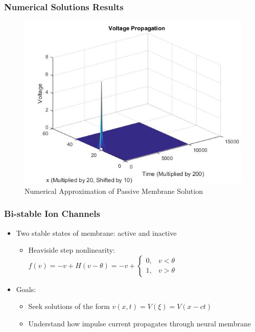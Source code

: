 \documentclass{beamer}
\begin{document}
\begin{frame}
\frametitle{Numerical Solutions Results}
\begin{figure}[H]
  \includegraphics[width=\linewidth]{Plot2.jpg}
  \caption{Numerical Approximation of Passive Membrane Solution}
  \label{fig:sketch2}
\end{figure}
\end{frame}


\begin{frame}
\frametitle{Bi-stable Ion Channels}
\begin{itemize}
\item Two stable states of membrane: active and inactive
	\begin{itemize}
		\item Heaviside step nonlinearity: $f(v)=-v+H(v-\theta)=-v+
		\begin{cases}
    		0, & \text{$v<\theta$}\\
    		1, & \text{$v>\theta$}
  		\end{cases}$
	\end{itemize}
\item Goals: 
	\begin{itemize}
		\item Seek solutions of the form $v(x,t)=V(\xi)=V(x-ct)$
		\item Understand how impulse current propagates through neural membrane
	\end{itemize}
\end{itemize}
\end{frame}
\end{document}
